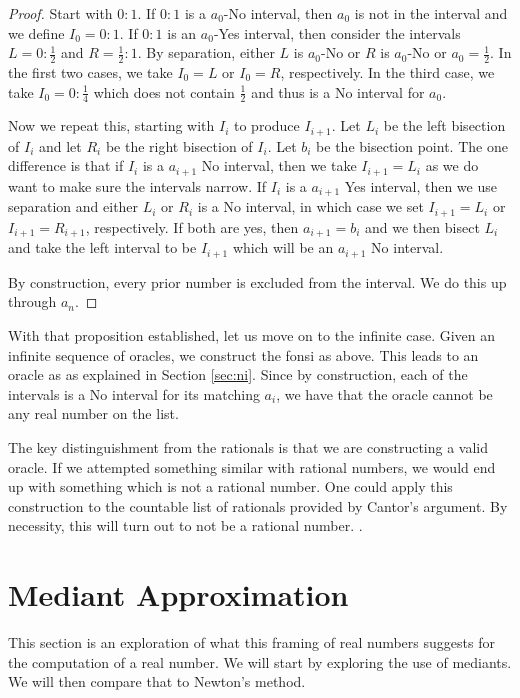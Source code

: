 \documentclass[12pt]{article}
\theoremstyle{remark}
\begin{document}
\begin{proof}
Start with $0:1$. If $0:1$ is a $a_0$-No interval, then $a_0$ is not in the interval and we define $I_0 = 0:1$. If $0:1$ is an $a_0$-Yes interval, then consider the intervals $L= 0:\tfrac{1}{2}$ and $R = \tfrac{1}{2}:1$. By separation, either $L$ is $a_0$-No or $R$ is $a_0$-No or $a_0 = \tfrac{1}{2}$. In the first two cases, we take $I_0=L$ or $I_0=R$, respectively. In the third case, we take $I_0 = 0:\tfrac{1}{4}$ which does not contain $\tfrac{1}{2}$ and thus is a No interval for $a_0$.

Now we repeat this, starting with $I_i$ to produce $I_{i+1}$. Let $L_i$ be the left bisection of $I_i$ and let $R_i$ be the right bisection of $I_i$. Let $b_i$ be the bisection point. The one difference is that if $I_i$ is a $a_{i+1}$ No interval, then we take $I_{i+1} = L_i$ as we do want to make sure the intervals narrow. If $I_i$ is a $a_{i+1}$ Yes interval, then we use separation and either $L_i$ or $R_i$ is a No interval, in which case we set $I_{i+1} = L_i $ or $I_{i+1} = R_{i+1}$, respectively. If both are yes, then $a_{i+1} = b_i$ and we then bisect $L_i$ and take the left interval to be $I_{i+1}$ which will be an $a_{i+1}$ No interval. 

By construction, every prior number is excluded from the interval. We do this up through $a_n$.
\end{proof} 

With that proposition established, let us move on to the infinite case. Given an infinite sequence of oracles, we construct the fonsi as above. This leads to an oracle as as explained in Section \ref{sec:ni}. Since by construction, each of the intervals is a No interval for its matching $a_i$, we have that the oracle cannot be any real number on the list. 

The key distinguishment from the rationals is that we are constructing a valid oracle. If we attempted something similar with rational numbers, we would end up with something which is not a rational number. One could apply this construction to the countable list of rationals provided by Cantor's argument. By necessity, this will turn out to not be a rational number. . 

\section{Mediant Approximation}\label{sec:mediant}

This section is an exploration of what this framing of real numbers suggests for the computation of a real number. We will start by exploring the use of mediants. We will then compare that to Newton's method. 
\end{document}
